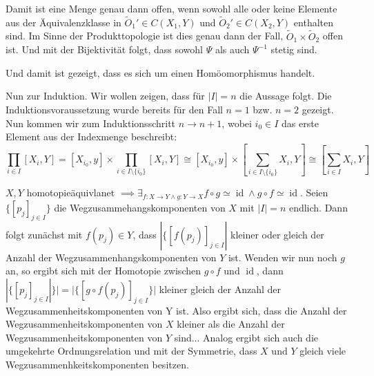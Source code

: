 \documentclass{scrartcl}
\newcommand{\id}{\operatorname{id}}
\begin{document}
\begin{aufgabe}
\begin{enumerate}
Damit ist eine Menge genau dann offen, wenn sowohl alle oder keine Elemente aus der Äquivalenzklasse in $\tilde O_1'\in C(X_1,Y)$ und $\tilde O_2'\in C(X_2,Y) $ enthalten sind. Im Sinne der Produkttopologie ist dies genau dann der Fall, $ \tilde O_1\times \tilde O_2 $ offen ist. Und mit der Bijektivität folgt, dass sowohl  $ \Psi $ als auch $ \Psi^{-1} $ stetig sind.
\end{enumerate}
Und damit ist gezeigt, dass es sich um einen Homöomorphismus handelt.

Nun zur Induktion.  Wir wollen zeigen, dass für $ |I|=n $ die Aussage folgt. Die Induktionsvoraussetzung wurde bereits für den Fall $ n=1 $ bzw. $ n=2 $ gezeigt. Nun kommen wir zum Induktionsschritt $ n\to n+1 $, wobei $ i_0 \in I $ das erste Element aus der Indexmenge beschreibt:
\[
\prod_{i\in I}[X_i, Y]=[X_{i_0},y]\times \prod_{i\in I\setminus\{i_0\}}[X_i,Y]\cong [X_{i_0},y] \times [\sum_{i\in I\setminus\{i_0\}}X_i,Y]\cong [\sum_{i\in I} X_i, Y]
\]
\end{aufgabe}
\newpage
\begin{aufgabe}
$ X,Y $ homotopieäquivlanet $ \implies \exists_{f: X\to Y \land g: Y\to X} f\circ g \simeq \id \land g\circ f \simeq \id $.  Seien $ \{[p_j]_{j\in I}\} $ die Wegzusammehangskomponenten von $ X $ mit $ |I|=n $ endlich.  Dann folgt zunächst mit $ f(p_j)\in Y $, dass $ |\{[f(p_j)]_{j\in I}| $ kleiner oder gleich der Anzahl der Wegzusammenhangskomponenten von $ Y $ ist.  Wenden wir nun noch $ g $ an, so ergibt sich mit der Homotopie zwischen $ g\circ f $ und $ \id $, dann $|\{[p_j]_{j\in I}|\}|=|\{[g\circ f(p_j)]_{j\in I}\}|$ kleiner gleich der Anzahl der Wegzusammenheitskomponenten von Y ist. Also ergibt sich, dass die Anzahl der Wegzusammenheitskomponenten von $ X $ kleiner als die Anzahl der Wegzusammenheitskomponenten von $ Y $ sind... Analog ergibt sich auch die umgekehrte Ordnungsrelation und mit der Symmetrie, dass $ X $ und $ Y $ gleich viele Wegzusammenhkeitskomponenten besitzen.
\end{aufgabe}
\end{document}
